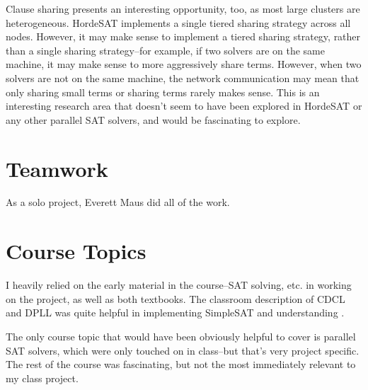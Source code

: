 \documentclass[10pt]{article}
\begin{document}
  Clause sharing presents an interesting opportunity, too, as most large clusters are heterogeneous.  HordeSAT \cite{hordesat} implements a single tiered sharing strategy across all nodes.  However, it may make sense to implement a tiered sharing strategy, rather than a single sharing strategy--for example, if two solvers are on the same machine, it may make sense to more aggressively share terms.  However, when two solvers are not on the same machine, the network communication may mean that only sharing small terms or sharing terms rarely makes sense.  This is an interesting research area that doesn't seem to have been explored in HordeSAT or any other parallel SAT solvers, and would be fascinating to explore.

\section{Teamwork}

As a solo project, Everett Maus did all of the work.

\section{Course Topics}

I heavily relied on the early material in the course--SAT solving, etc. in working on the project, as well as both textbooks.  The classroom description of CDCL and DPLL was quite helpful in implementing SimpleSAT and understanding .

The only course topic that would have been obviously helpful to cover is parallel SAT solvers, which were only touched on in class--but that's very project specific.  The rest of the course was fascinating, but not the most
immediately relevant to my class project.

\printbibliography[title={Bibliography}]
\end{document}
